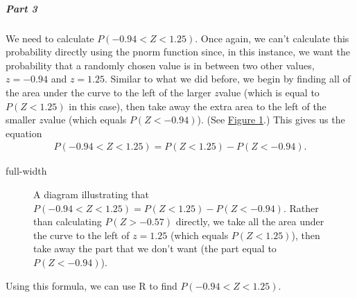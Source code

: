 \documentclass[letterpaper,10pt,english]{jupyterBook}
\begin{document}
\subparagraph{Part 3}
\label{\detokenize{Ch4 The Normal Distribution and the Central Limit Theorem/4.2 The Standard Normal Distribution:part-3}}
\sphinxAtStartPar
We need to calculate \(P(-0.94 < Z < 1.25)\). Once again, we can’t calculate this probability directly using the pnorm function since, in this instance, we want the probability that a randomly chosen value is in between two other values, \(z = -0.94\) and \(z = 1.25\). Similar to what we did before, we begin by finding all of the area under the curve to the left of the larger \(z\)\sphinxhyphen{}value (which is equal to \(P(Z < 1.25)\) in this case), then take away the extra area to the left of the smaller \(z\)\sphinxhyphen{}value (which equals \(P(Z < -0.94)\)). (See \hyperref[\detokenize{Ch4 The Normal Distribution and the Central Limit Theorem/4.2 The Standard Normal Distribution:stdnormals-between-eqn}]{Figure \ref{\detokenize{Ch4 The Normal Distribution and the Central Limit Theorem/4.2 The Standard Normal Distribution:stdnormals-between-eqn}}}.) This gives us the equation
\begin{equation*}
\begin{split} P(-0.94 < Z < 1.25) = P(Z < 1.25) - P(Z < -0.94). \end{split}
\end{equation*}
\begin{sphinxuseclass}{full-width}
\begin{figure}[htbp]
\centering
\capstart

\noindent{}
\caption{A diagram illustrating that \(P(-0.94 < Z < 1.25) = P(Z < 1.25) - P(Z < -0.94)\). Rather than calculating \(P(Z > -0.57)\) directly, we take all the area under the curve to the left of \(z = 1.25\) (which equals \(P(Z < 1.25)\)), then take away the part that we don’t want (the part equal to \(P(Z < -0.94)\)).}\label{\detokenize{Ch4 The Normal Distribution and the Central Limit Theorem/4.2 The Standard Normal Distribution:stdnormals-between-eqn}}\end{figure}

\end{sphinxuseclass}
\sphinxAtStartPar
Using this formula, we can use R to find \(P(-0.94 < Z < 1.25)\).
\end{document}
